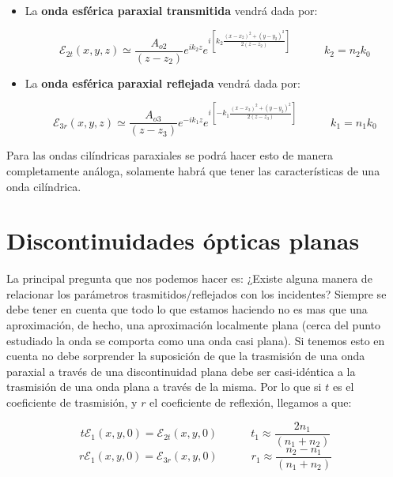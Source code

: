 \documentclass[12pt,a4paper]{book}
\numberwithin{equation}{section}
\numberwithin{figure}{section}
\newcommand{\tquad}{\quad \quad \quad}
\newcommand{\ccorchetes}[1]{\left[ #1  \right]}
\newcommand{\1}{_{(1)}}
\newcommand{\2}{_{(2)}}
\theoremstyle{definition}
\begin{document}
\begin{itemize}
\item La \textbf{onda esférica paraxial transmitida} vendrá dada por:

\begin{equation}
\mathcal{E}_{2t} (x,y,z) \simeq  \dfrac{A_{o2}}{(z-z_2)} e^{i k_2 z}  e^{i \ccorchetes{k_2 \frac{(x-x_2)^2+(y-y_2)^2}{2 (z-z_2)}}}  \tquad k_2 = n_2 k_0
\end{equation}

\item La \textbf{onda esférica paraxial reflejada} vendrá dada por:

\begin{equation}
\mathcal{E}_{3r} (x,y,z) \simeq  \dfrac{A_{o3}}{(z-z_3)} e^{-i k_1 z}  e^{i \ccorchetes{-k_1 \frac{(x-x_3)^2+(y-y_3)^2}{2 (z-z_3)}}}  \tquad k_1 = n_1 k_0
\end{equation}
\end{itemize}

Para las ondas cilíndricas paraxiales se podrá hacer esto de manera completamente análoga, solamente habrá que tener las características de una onda cilíndrica.

\section{Discontinuidades ópticas planas}

La principal pregunta que nos podemos hacer es: ¿Existe alguna manera de relacionar los parámetros trasmitidos/reflejados con los incidentes? Siempre se debe tener en cuenta que todo lo que estamos haciendo no es mas que una aproximación, de hecho, una aproximación localmente plana (cerca del punto estudiado la onda se comporta como una onda casi plana). Si tenemos esto en cuenta no debe sorprender  la suposición de que la trasmisión de una onda paraxial a través de una discontinuidad plana debe ser casi-idéntica a la trasmisión de una onda plana a través de la misma. Por lo que si $t$ es el coeficiente de trasmisión, y $r$ el coeficiente de reflexión, llegamos a que: 

\begin{equation}
t \mathcal{E}_1 (x,y,0) = \mathcal{E}_{2t} (x,y,0) \tquad t_1 \approx \dfrac{2 n_1}{(n_1 + n_2)} \label{Ec:01.07-01}
\end{equation}
\begin{equation}
r \mathcal{E}_1 (x,y,0) = \mathcal{E}_{3r} (x,y,0) \tquad r_1 \approx \dfrac{n_2-n_1}{(n_1 + n_2)} 
\end{equation}
\end{document}

